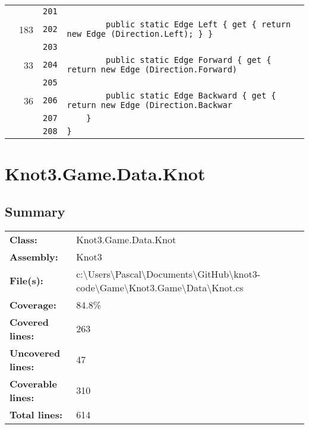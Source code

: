 \documentclass[a4paper,10pt]{article}
\begin{document}
\begin{longtable}[l]{lrrl}
\cellcolor{gray} &  & \verb~201~ & \verb~~\\
\cellcolor{green} & 183 & \verb~202~ & \verb~        public static Edge Left { get { return new Edge (Direction.Left); } }~\\
\cellcolor{gray} &  & \verb~203~ & \verb~~\\
\cellcolor{green} & 33 & \verb~204~ & \verb~        public static Edge Forward { get { return new Edge (Direction.Forward)~\\
\cellcolor{gray} &  & \verb~205~ & \verb~~\\
\cellcolor{green} & 36 & \verb~206~ & \verb~        public static Edge Backward { get { return new Edge (Direction.Backwar~\\
\cellcolor{gray} &  & \verb~207~ & \verb~    }~\\
\cellcolor{gray} &  & \verb~208~ & \verb~}~\\
\end{longtable}
\newpage
\section{Knot3.Game.Data.Knot}
\subsection{Summary}
\begin{longtable}[l]{ll}
\textbf{Class:} & Knot3.Game.Data.Knot\\
\textbf{Assembly:} & Knot3\\
\textbf{File(s):} & \begin{minipage}[t]{12cm}{c:\textbackslash Users\textbackslash Pascal\textbackslash Documents\textbackslash GitHub\textbackslash knot3-code\textbackslash Game\textbackslash Knot3.Game\textbackslash Data\textbackslash Knot.cs}\end{minipage} \\
\textbf{Coverage:} & 84.8\%\\
\textbf{Covered lines:} & 263\\
\textbf{Uncovered lines:} & 47\\
\textbf{Coverable lines:} & 310\\
\textbf{Total lines:} & 614\\
\end{longtable}
\end{document}
